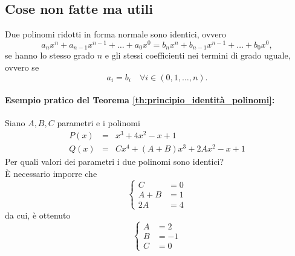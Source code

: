 \subsection{Cose non fatte ma utili}
\begin{theorem}\label{th:principio_identità_polinomi}
		Due polinomi ridotti in forma normale sono identici, ovvero
		\begin{equation*}
			a_nx^n+a_{n-1}x^{n-1}+\hdots+a_0x^0 = b_nx^n+b_{n-1}x^{n-1}+\hdots+b_0x^0,
		\end{equation*}
		se hanno lo stesso grado $n$ e gli stessi coefficienti nei termini di grado uguale, ovvero se
		\begin{equation*}
			a_i=b_i\quad\forall i\in(0,1,\hdots, n).
		\end{equation*}
\end{theorem}
\paragraph{Esempio pratico del Teorema \ref{th:principio_identità_polinomi}:} Siano $A,B,C$ parametri e i \gls{polinomi}
\begin{equation*}
	\begin{matrix}
		P(x) &=& x^3 + 4x^2-x+1\\
		Q(x) &=& Cx^4 + (A+B)x^3+2Ax^2-x+1
	\end{matrix}
\end{equation*}
Per quali valori dei parametri i due polinomi sono identici?\\
È necessario imporre che
\begin{equation*}
	\begin{cases}
		C&=0\\
		A+B &= 1\\
		2A &= 4
	\end{cases}
\end{equation*}
da cui, è ottenuto
\begin{equation*}
	\begin{cases}
		A &= 2\\
		B &= - 1\\
		C&=0
	\end{cases}
\end{equation*}

